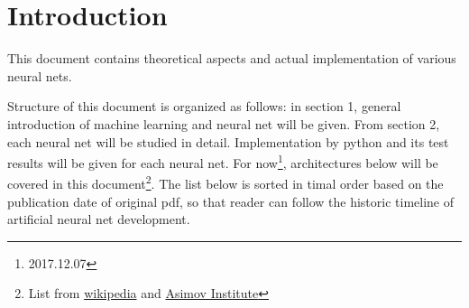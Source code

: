 \section{Introduction} 

This document contains theoretical aspects and actual implementation of various neural nets. 

Structure of this document is organized as follows: in section 1, general introduction of machine learning and neural net will be given. From section 2, each neural net will be studied in detail. Implementation by python and its test results will be given for each neural net. For now\footnote{2017.12.07}, architectures below will be covered in this document\footnote{List from \href{https://en.wikipedia.org/wiki/Types_of_artificial_neural_networks}{wikipedia} and \href{http://www.asimovinstitute.org/neural-network-zoo/}{Asimov Institute}}. 
The list below is sorted in timal order based on the publication date of original pdf, so that reader can follow the historic timeline of artificial neural net development. 

